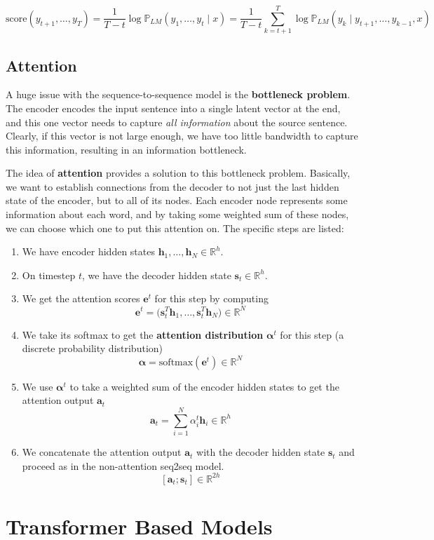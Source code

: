 \documentclass{article}
\begin{document}
    \[\mathrm{score}(y_{t+1}, \ldots, y_T) = \frac{1}{T-t} \log \mathbb{P}_{LM} (y_1, \ldots, y_t \mid x) = \frac{1}{T-t} \sum_{k=t+1}^T \log \mathbb{P}_{LM} ( y_k \mid y_{t+1}, \ldots, y_{k-1}, x) \]

  \subsection{Attention}

    A huge issue with the sequence-to-sequence model is the \textbf{bottleneck problem}. The encoder encodes the input sentence into a single latent vector at the end, and this one vector needs to capture \textit{all information} about the source sentence. Clearly, if this vector is not large enough, we have too little bandwidth to capture this information, resulting in an information bottleneck. 

    The idea of \textbf{attention} provides a solution to this bottleneck problem. Basically, we want to establish connections from the decoder to not just the last hidden state of the encoder, but to all of its nodes. Each encoder node represents some information about each word, and by taking some weighted sum of these nodes, we can choose which one to put this attention on. The specific steps are listed: 
    \begin{enumerate}
        \item We have encoder hidden states $\mathbf{h}_1, \ldots, \mathbf{h}_N \in \mathbb{R}^h$. 
        \item On timestep $t$, we have the decoder hidden state $\mathbf{s}_t \in \mathbb{R}^h$.  
        \item We get the attention scores $\mathbf{e}^t$ for this step by computing 
        \[\mathbf{e}^t = \big( \mathbf{s}_t^T \mathbf{h}_1 , \ldots, \mathbf{s}_t^T \mathbf{h}_N \big) \in \mathbb{R}^N\]
        \item We take its softmax to get the \textbf{attention distribution} $\boldsymbol{\alpha}^t$ for this step (a discrete probability distribution) 
        \[\boldsymbol{\alpha} = \mathrm{softmax} (\mathbf{e}^t) \in \mathbb{R}^N\]

        \item We use $\boldsymbol{\alpha}^t$ to take a weighted sum of the encoder hidden states to get the attention output $\mathbf{a}_t$ 
        \[\mathbf{a}_t = \sum_{i=1}^N \alpha_i^t \mathbf{h}_i \in \mathbb{R}^h\]

        \item We concatenate the attention output $\mathbf{a}_t$ with the decoder hidden state $\mathbf{s}_t$ and proceed as in the non-attention seq2seq model. 
        \[[\mathbf{a}_t ; \mathbf{s}_t ] \in \mathbb{R}^{2h}\]
    \end{enumerate}

\section{Transformer Based Models}
\end{document}
